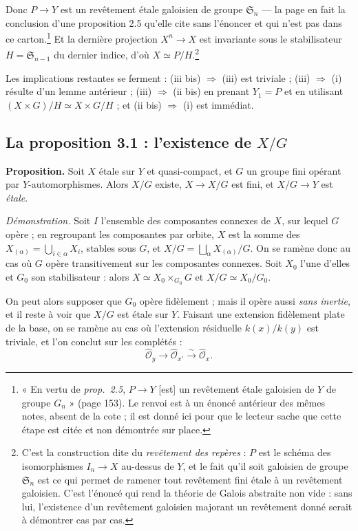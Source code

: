 \documentclass[11pt,a4paper]{article}
\begin{document}
Donc $P \to Y$ est un revêtement étale galoisien de groupe
$\mathfrak{S}_{n}$ --- la page en fait la conclusion d'une proposition 2.5
qu'elle cite sans l'énoncer et qui n'est pas dans ce carton.\footnote{« En
vertu de \emph{prop.\ 2.5}, $P \to Y$ [est] un revêtement étale galoisien de
$Y$ de groupe $G_n$ » (page 153). Le renvoi est à un énoncé antérieur des
mêmes notes, absent de la cote ; il est donné ici pour que le lecteur sache
que cette étape est citée et non démontrée sur place.} Et la dernière
projection $X^{n} \to X$ est invariante sous
le stabilisateur $H = \mathfrak{S}_{n-1}$ du dernier indice, d'où
$X \simeq P/H$.\footnote{C'est la construction dite du \emph{revêtement des
repères} : $P$ est le schéma des isomorphismes $I_{n} \to X$ au-dessus de $Y$,
et le fait qu'il soit galoisien de groupe $\mathfrak{S}_{n}$ est ce qui permet
de ramener tout revêtement fini étale à un revêtement galoisien. C'est l'énoncé
qui rend la théorie de Galois abstraite non vide : sans lui, l'existence d'un
revêtement galoisien majorant un revêtement donné serait à démontrer cas par
cas.}

Les implications restantes se ferment : (iii bis) $\Rightarrow$ (iii) est
triviale ; (iii) $\Rightarrow$ (i) résulte d'un lemme antérieur ; (iii)
$\Rightarrow$ (ii bis) en prenant $Y_{1} = P$ et en utilisant
$(X \times G)/H \simeq X \times G/H$ ; et (ii bis) $\Rightarrow$ (i) est
immédiat.

\subsection*{La proposition 3.1 : l'existence de $X/G$}

\textbf{Proposition.} Soit $X$ étale sur $Y$ et quasi-compact, et $G$ un groupe
fini opérant par $Y$-automorphismes. Alors $X/G$ existe, $X \to X/G$ est fini,
et $X/G \to Y$ est \emph{étale}.

\emph{Démonstration.} Soit $I$ l'ensemble des composantes connexes de $X$, sur
lequel $G$ opère ; en regroupant les composantes par orbite, $X$ est la somme
des $X_{(\alpha)} = \bigcup_{i \in \alpha} X_{i}$, stables sous $G$, et
$X/G = \bigsqcup_{\alpha} X_{(\alpha)}/G$. On se ramène donc au cas où $G$
opère transitivement sur les composantes connexes. Soit $X_{0}$ l'une d'elles
et $G_{0}$ son stabilisateur : alors $X \simeq X_{0} \times_{G_{0}} G$ et
$X/G \simeq X_{0}/G_{0}$.

On peut alors supposer que $G_{0}$ opère fidèlement ; mais il opère aussi
\emph{sans inertie}, et il reste à voir que $X/G$ est étale sur $Y$. Faisant
une extension fidèlement plate de la base, on se ramène au cas où l'extension
résiduelle $k(x)/k(y)$ est triviale, et l'on conclut sur les complétés :
\[
  \hat{\mathcal{O}}_{y} \longrightarrow \hat{\mathcal{O}}_{x'}
  \xrightarrow{\ \sim\ } \hat{\mathcal{O}}_{x} .
\]
\end{document}
